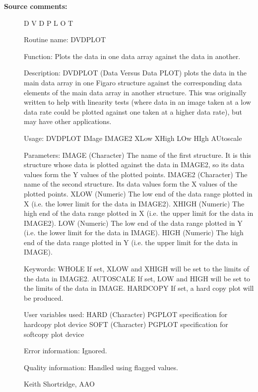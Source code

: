 \begin{description}
\begin{description}
\item [\textbf{Source comments:}]
\begin{terminalv}
 D V D P L O T

 Routine name:
    DVDPLOT

 Function:
    Plots the data in one data array against the data in another.

 Description:
    DVDPLOT (Data Versus Data PLOT) plots the data in the main data
    array in one Figaro structure against the corresponding data elements
    of the main data array in another structure.  This was originally
    written to help with linearity tests (where data in an image taken
    at a low data rate could be plotted against one taken at a higher
    data rate), but may have other applications.

 Usage:
    DVDPLOT IMage IMAGE2 XLow XHigh LOw HIgh AUtoscale

 Parameters:
    IMAGE     (Character) The name of the first structure.  It is this
              structure whose data is plotted against the data in IMAGE2,
              so its data values form the Y values of the plotted points.
    IMAGE2    (Character) The name of the second structure.  Its data
              values form the X values of the plotted points.
    XLOW      (Numeric) The low end of the data range plotted in X (i.e.
              the lower limit for the data in IMAGE2).
    XHIGH     (Numeric) The high end of the data range plotted in X (i.e.
              the upper limit for the data in IMAGE2).
    LOW       (Numeric) The low end of the data range plotted in Y (i.e.
              the lower limit for the data in IMAGE).
    HIGH      (Numeric) The high end of the data range plotted in Y (i.e.
              the upper limit for the data in IMAGE).

 Keywords:
    WHOLE     If set, XLOW and XHIGH will be set to the limits
              of the data in IMAGE2.
    AUTOSCALE If set, LOW and HIGH will be set to the limits
              of the data in IMAGE.
    HARDCOPY  If set, a hard copy plot will be produced.

 User variables used:
    HARD      (Character) PGPLOT specification for hardcopy plot device
    SOFT      (Character) PGPLOT specification for softcopy plot device

 Error information:  Ignored.

 Quality information:  Handled using flagged values.

 Keith Shortridge, AAO
\end{terminalv}
\end{description}

\end{description}
